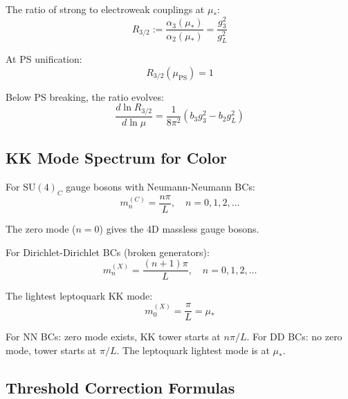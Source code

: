 \documentclass[11pt,a4paper]{article}
\theoremstyle{definition}
\begin{document}
The ratio of strong to electroweak couplings at $\mu_*$:
\begin{equation}
  \label{eq:strong-ew-ratio}
  R_{3/2} := \frac{\alpha_3(\mu_*)}{\alpha_2(\mu_*)} = \frac{g_3^2}{g_L^2}
\end{equation}

At PS unification:
\begin{equation}
  \label{eq:ratio-unif}
  R_{3/2}(\mu_{\text{PS}}) = 1
\end{equation}

Below PS breaking, the ratio evolves:
\begin{equation}
  \label{eq:ratio-evolve}
  \frac{d\ln R_{3/2}}{d\ln\mu} = \frac{1}{8\pi^2}(b_3 g_3^2 - b_2 g_L^2)
\end{equation}

\subsection{KK Mode Spectrum for Color}
\label{subsec:kk-color}

For $\text{SU}(4)_C$ gauge bosons with Neumann-Neumann BCs:
\begin{equation}
  \label{eq:kk-mass-nn}
  m_n^{(C)} = \frac{n\pi}{L}, \quad n = 0, 1, 2, \ldots
\end{equation}

The zero mode ($n = 0$) gives the 4D massless gauge bosons.

For Dirichlet-Dirichlet BCs (broken generators):
\begin{equation}
  \label{eq:kk-mass-dd}
  m_n^{(X)} = \frac{(n + 1)\pi}{L}, \quad n = 0, 1, 2, \ldots
\end{equation}

The lightest leptoquark KK mode:
\begin{equation}
  \label{eq:leptoquark-kk}
  m_0^{(X)} = \frac{\pi}{L} = \mu_*
\end{equation}

\begin{trapbox}
For NN BCs: zero mode exists, KK tower starts at $n\pi/L$.
For DD BCs: no zero mode, tower starts at $\pi/L$.
The leptoquark lightest mode is at $\mu_*$.
\end{trapbox}

\subsection{Threshold Correction Formulas}
\label{subsec:threshold-formulas}
\end{document}
